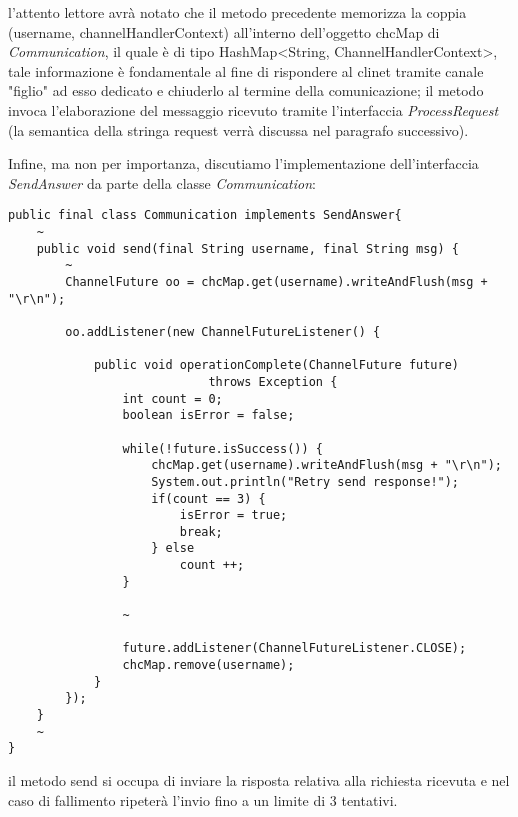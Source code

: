 l'attento lettore avrà notato che il metodo precedente memorizza la coppia (username, channelHandlerContext) all'interno dell'oggetto chcMap di \textit{Communication}, il quale è di tipo HashMap<String, ChannelHandlerContext>, tale informazione è fondamentale al fine di rispondere al clinet tramite canale "figlio" ad esso dedicato e chiuderlo al termine della comunicazione; il metodo invoca l'elaborazione del messaggio ricevuto tramite l'interfaccia \textit{ProcessRequest} (la semantica della stringa request verrà discussa nel paragrafo successivo).


Infine, ma non per importanza, discutiamo l'implementazione dell'interfaccia \textit{SendAnswer} da parte della classe \textit{Communication}:
\begin{lstlisting}
public final class Communication implements SendAnswer{
	~
	public void send(final String username, final String msg) {
		~
		ChannelFuture oo = chcMap.get(username).writeAndFlush(msg + "\r\n");
		
		oo.addListener(new ChannelFutureListener() {
		
			public void operationComplete(ChannelFuture future)	
							throws Exception {
				int count = 0;
				boolean isError = false;
				
				while(!future.isSuccess()) {
					chcMap.get(username).writeAndFlush(msg + "\r\n");
					System.out.println("Retry send response!");
					if(count == 3) {
						isError = true;
						break;
					} else 
						count ++;
				}
				
				~
				
				future.addListener(ChannelFutureListener.CLOSE);
				chcMap.remove(username);
			}
		});
	}
	~
}
\end{lstlisting}
il metodo send si occupa di inviare la risposta relativa alla richiesta ricevuta e nel caso di fallimento ripeterà l'invio fino a un limite di 3 tentativi.
\newpage


